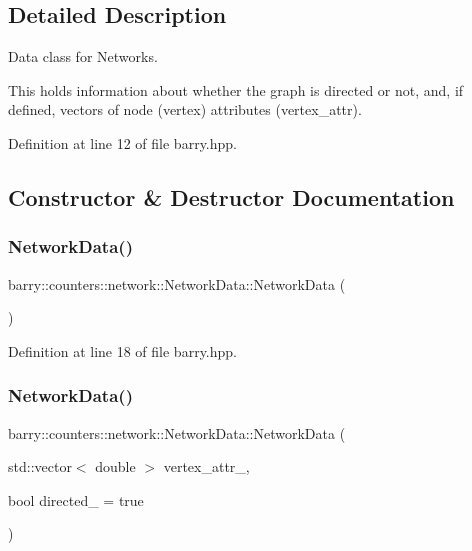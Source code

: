 \subsection{Detailed Description}
Data class for Networks. 

This holds information about whether the graph is directed or not, and, if defined, vectors of node (vertex) attributes ({\ttfamily vertex\+\_\+attr}). 

Definition at line 12 of file barry.\+hpp.



\subsection{Constructor \& Destructor Documentation}
\mbox{\label{classbarry_1_1counters_1_1network_1_1_network_data_a285d956b719012c5296aa537aca17fb2}} 
\subsubsection{\texorpdfstring{Network\+Data()}{NetworkData()}\hspace{0.1cm}{\footnotesize\ttfamily [1/3]}}
{\footnotesize\ttfamily barry\+::counters\+::network\+::\+Network\+Data\+::\+Network\+Data (\begin{DoxyParamCaption}{ }\end{DoxyParamCaption})\hspace{0.3cm}{\ttfamily [inline]}}



Definition at line 18 of file barry.\+hpp.

\mbox{\label{classbarry_1_1counters_1_1network_1_1_network_data_a6db461d607e95bc04dfb527f3422142d}} 
\subsubsection{\texorpdfstring{Network\+Data()}{NetworkData()}\hspace{0.1cm}{\footnotesize\ttfamily [2/3]}}
{\footnotesize\ttfamily barry\+::counters\+::network\+::\+Network\+Data\+::\+Network\+Data (\begin{DoxyParamCaption}\item[{std\+::vector$<$ double $>$}]{vertex\+\_\+attr\+\_\+,  }\item[{bool}]{directed\+\_\+ = {\ttfamily true} }\end{DoxyParamCaption})\hspace{0.3cm}{\ttfamily [inline]}}



